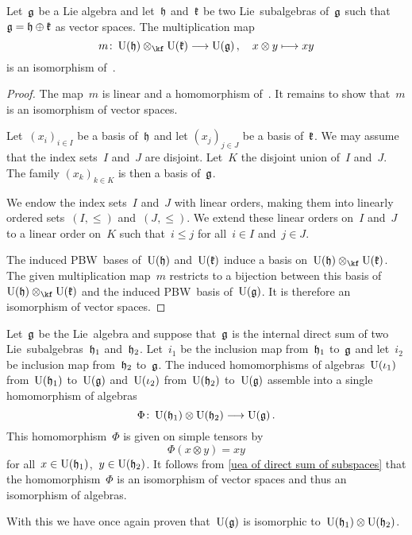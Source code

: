\begin{proposition}
	\label{uea of direct sum of subspaces}
	Let~$\mathfrak{g}$ be a Lie algebra and let~$\mathfrak{h}$ and~$\mathfrak{k}$ be two Lie~subalgebras of~$\mathfrak{g}$ such that~$\mathfrak{g} = \mathfrak{h} \oplus \mathfrak{k}$ as vector spaces.
	The multiplication map
	\[
		m
		\colon
		\Univ(\hlie) \tensor_{\kf} \Univ(\klie)
		\to
		\Univ(\glie) \,,
		\quad
		x \tensor y
		\mapsto
		xy
	\]
	is an isomorphism of~\bimodules{$\Univ(\hlie)$}{$\Univ(\klie)$}.
\end{proposition}


\begin{proof}
	The map~$m$ is linear and a homomorphism of~\bimodules{$\Univ(\hlie)$}{$\Univ(\klie)$}.
	It remains to show that~$m$ is an isomorphism of vector spaces.

	Let~$(x_i)_{i \in I}$ be a basis of~$\mathfrak{h}$ and let $(x_j)_{j \in J}$ be a basis of~$\mathfrak{k}$.
	We may assume that the index sets~$I$ and~$J$ are disjoint.
	Let~$K$ the disjoint union of~$I$ and~$J$.
	The family $(x_k)_{k \in K}$ is then a basis of~$\mathfrak{g}$.

	We endow the index sets~$I$ and~$J$ with linear orders, making them into linearly ordered sets~$(I, \leq)$ and~$(J, \leq)$.
	We extend these linear orders on~$I$ and~$J$ to a linear order on~$K$ such that~$i \leq j$ for all~$i \in I$ and~$j \in J$.

	The induced PBW~bases of~$\Univ(\hlie)$ and~$\Univ(\klie)$ induce a basis on~$\Univ(\hlie) \otimes_{\kf} \Univ(\klie)$.
	The given multiplication map~$m$ restricts to a bijection between this basis of~$\Univ(\hlie) \otimes_{\kf} \Univ(\klie)$ and the induced PBW~basis of~$\operatorname{U}(\mathfrak{g})$.
	It is therefore an isomorphism of vector spaces.
\end{proof}


\begin{remark}
	Let~$\mathfrak{g}$ be the Lie~algebra and suppose that~$\mathfrak{g}$ is the internal direct sum of two Lie~subalgebras~$\mathfrak{h}_1$ and~$\mathfrak{h}_2$.
	Let~$i_1$ be the inclusion map from~$\mathfrak{h}_1$ to~$\mathfrak{g}$ and let~$i_2$ be inclusion map from~$\mathfrak{h}_2$ to~$\mathfrak{g}$.
	The induced homomorphisms of algebras~$\operatorname{U}(\iota_1)$ from~$\operatorname{U}(\mathfrak{h}_1)$ to~$\operatorname{U}(\mathfrak{g})$ and~$\operatorname{U}(\iota_2)$ from~$\operatorname{U}(\mathfrak{h}_2)$ to~$\operatorname{U}(\mathfrak{g})$ assemble into a single homomorphism of algebras
	\[
		\Phi
		\colon
		\Univ(\hlie_1) \otimes \Univ(\hlie_2)
		\to
		\Univ(\glie) \,.
	\]
	This homomorphism~$\Phi$ is given on simple tensors by
	\[
		\Phi(x \otimes y)
		=
		x y
	\]
	for all~$x \in \operatorname{U}(\mathfrak{h}_1)$,~$y \in \operatorname{U}(\mathfrak{h}_2)$.
	It follows from \cref{uea of direct sum of subspaces} that the homomorphism~$\Phi$ is an isomorphism of vector spaces and thus an isomorphism of algebras.

	With this we have once again proven that~$\operatorname{U}(\mathfrak{g})$ is isomorphic to~$\operatorname{U}(\mathfrak{h}_1) \otimes \operatorname{U}(\mathfrak{h}_2)$.
\end{remark}



